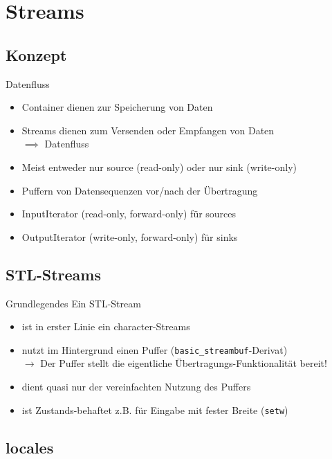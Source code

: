 \section{Streams}


\subsection{Konzept}

\begin{frame}{Datenfluss}
	\begin{itemize}
		\item Container dienen zur Speicherung von Daten
		\item Streams dienen zum Versenden oder Empfangen von Daten\\
		      $\implies$ Datenfluss
		\item Meist entweder nur source (read-only) oder nur sink (write-only)
		\item Puffern von Datensequenzen vor/nach der Übertragung
		\item InputIterator (read-only, forward-only) für sources
		\item OutputIterator (write-only, forward-only) für sinks
	\end{itemize}
\end{frame}


\subsection{STL-Streams}

\begin{frame}{Grundlegendes}
	Ein STL-Stream
	\begin{itemize}
		\item ist in erster Linie ein character-Streams
		\item nutzt im Hintergrund einen Puffer (\texttt{basic\_streambuf}-Derivat)\\
			$\rightarrow$ Der Puffer stellt die eigentliche Übertragungs-Funktionalität bereit!
		\item dient quasi nur der vereinfachten Nutzung des Puffers
		\item ist Zustands-behaftet z.B. für Eingabe mit fester Breite (\texttt{setw})
	\end{itemize}
\end{frame}


\subsection{locales}

